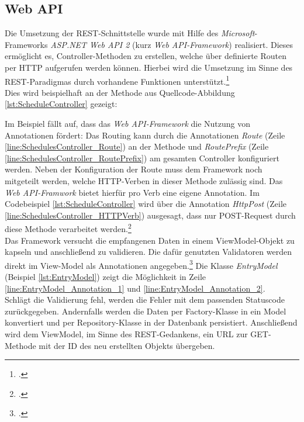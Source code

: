 \subsection{Web API}
\label{ssec:aufbau-webapi}
Die Umsetzung der \ac{REST}-Schnittstelle wurde mit Hilfe des \textit{Microsoft}-Frameworks \textit{ASP.NET Web API 2} (kurz \textit{Web \ac{API}-Framework}) realisiert. Dieses ermöglicht es, Controller-Methoden zu erstellen, welche über definierte Routen per \ac{HTTP} aufgerufen werden können. Hierbei wird die Umsetzung im Sinne des \ac{REST}-Paradigmas durch vorhandene Funktionen unterstützt.\footcite[S. 2ff.]{Building-a-REST-Service}\\
Dies wird beispielhaft an der Methode aus  Quellcode-Abbildung \ref{lst:ScheduleController} gezeigt:

Im Beispiel fällt auf, dass das \textit{Web \ac{API}-Framework} die Nutzung von Annotationen fördert: Das Routing kann durch die Annotationen \textit{Route} (Zeile \ref{line:SchedulesController_Route}) an der Methode und \textit{RoutePrefix} (Zeile \ref{line:SchedulesController_RoutePrefix}) am gesamten Controller konfiguriert werden. Neben der Konfiguration der Route muss dem Framework noch mitgeteilt werden, welche \ac{HTTP}-Verben in dieser Methode zulässig sind. Das \textit{Web \ac{API}-Framwork} bietet hierfür pro Verb eine eigene Annotation. Im Codebeispiel \ref{lst:ScheduleController} wird über die Annotation \textit{HttpPost} (Zeile \ref{line:SchedulesController_HTTPVerb}) ausgesagt, dass nur POST-Request durch diese Methode verarbeitet werden.\footcite{webApi-AttributeRouting} \\
Das Framework versucht die empfangenen Daten in einem ViewModel-Objekt zu kapseln und anschließend zu validieren. Die dafür genutzten Validatoren werden direkt im View-Model als Annotationen angegeben.\footcite{webApi-Validation} Die Klasse \textit{EntryModel} (Beispiel \ref{lst:EntryModel}) zeigt die Möglichkeit in Zeile \ref{line:EntryModel_Annotation_1} und \ref{line:EntryModel_Annotation_2}. \\ 

Schlägt die Validierung fehl, werden die Fehler mit dem passenden Statuscode zurückgegeben. Andernfalls werden die Daten per \gls{Factory}-Klasse in ein Model konvertiert und per \gls{Repository}-Klasse in der Datenbank persistiert. Anschließend wird dem ViewModel, im Sinne des \ac{REST}-Gedankens, ein URL zur GET-Methode mit der ID des neu erstellten Objekts übergeben. 
